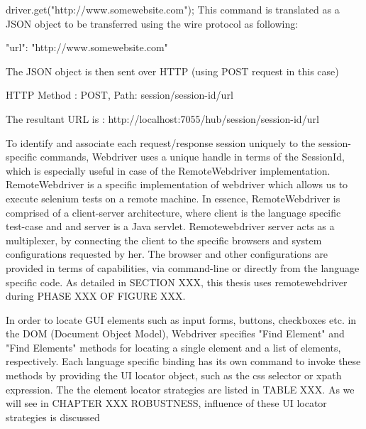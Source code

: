 driver.get("http://www.somewebsite.com");
This command is translated as a JSON object to be transferred using the wire protocol as following: 

{"url": "http://www.somewebsite.com" }

The JSON object is then sent over HTTP (using POST request in this case)

HTTP Method : POST, Path: session/{session-id}/url

The resultant URL is :
http://localhost:7055/hub/session/{session-id}/url

To identify and associate each request/response session uniquely to the session-specific commands, Webdriver uses a unique handle in terms of the SessionId, which is especially useful in case of the RemoteWebdriver implementation. RemoteWebdriver is a specific implementation of webdriver which allows us to execute selenium tests on a remote machine. In essence, RemoteWebdriver is comprised of a client-server architecture, where client is the language specific test-case and and server is a Java servlet. Remotewebdriver server acts as a multiplexer, by connecting the client to the specific browsers and system configurations requested by her. The browser and other configurations are provided in terms of capabilities, via command-line or directly from the language specific code. As detailed in SECTION XXX, this thesis uses remotewebdriver during PHASE XXX OF FIGURE XXX.

In order to locate GUI elements such as input forms, buttons, checkboxes etc. in the DOM (Document Object Model), Webdriver specifies "Find Element" and "Find Elements" methods for locating a single element and a list of elements, respectively. Each language specific binding has its own command to invoke these methods by providing the UI locator object, such as the css selector or xpath expression. The the element locator strategies are listed in TABLE XXX. As we will see in CHAPTER XXX ROBUSTNESS, influence of these UI locator strategies is discussed 



